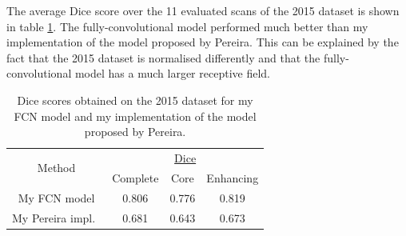 \documentclass[12pt,a4paper,twoside,openright]{report}
\begin{document}
\begin{table}[h]
\centering	
{}
\caption{Comparison of model performances on the Brats2013 Challenge dataset.}
\label{table:comparison}
\end{table}

The average Dice score over the 11 evaluated scans of the 2015 dataset is shown in table \ref{table:2015_dice}. The fully-convolutional model performed much better than my implementation of the model proposed by Pereira. This can be explained by the fact that the 2015 dataset is normalised differently and that the fully-convolutional model has a much larger receptive field.
\begin{table}
\centering	
\begin{tabular}{c | c c c }
\multirow{2}{*}{Method} & \multicolumn{3}{c}{\underline{Dice}} \\
 & Complete & Core & Enhancing \\
 \hline
 My FCN model & 0.806 & 0.776 & 0.819\\
 My Pereira impl.\ & 0.681 & 0.643 & 0.673\\
\end{tabular}
\caption{Dice scores obtained on the 2015 dataset for my FCN model and my implementation of the model proposed by Pereira.}
\label{table:2015_dice}
\end{table}
\end{document}
